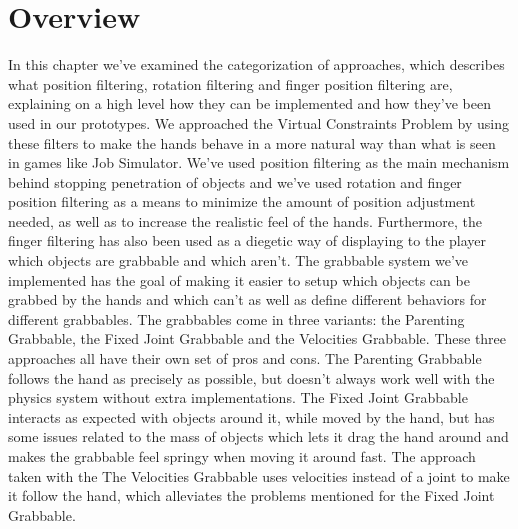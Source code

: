 \section{Overview}
\label{sec:experimentalAnalysisOverview}
In this chapter we've examined the categorization of approaches, which describes what position filtering, rotation filtering and finger position filtering are, explaining on a high level how they can be implemented and how they've been used in our prototypes. We approached the Virtual Constraints Problem by using these filters to make the hands behave in a more natural way than what is seen in games like Job Simulator. We've used position filtering as the main mechanism behind stopping penetration of objects and we've used rotation and finger position filtering as a means to minimize the amount of position adjustment needed, as well as to increase the realistic feel of the hands. Furthermore, the finger filtering has also been used as a diegetic way of displaying to the player which objects are grabbable and which aren't. The grabbable system we've implemented has the goal of making it easier to setup which objects can be grabbed by the hands and which can't as well as define different behaviors for different grabbables. The grabbables come in three variants: the Parenting Grabbable, the Fixed Joint Grabbable and the Velocities Grabbable. These three approaches all have their own set of pros and cons. The Parenting Grabbable follows the hand as precisely as possible, but doesn't always work well with the physics system without extra implementations. The Fixed Joint Grabbable interacts as expected with objects around it, while moved by the hand, but has some issues related to the mass of objects which lets it drag the hand around and makes the grabbable feel springy when moving it around fast. The approach taken with the The Velocities Grabbable uses velocities instead of a joint to make it follow the hand, which alleviates the problems mentioned for the Fixed Joint Grabbable.

